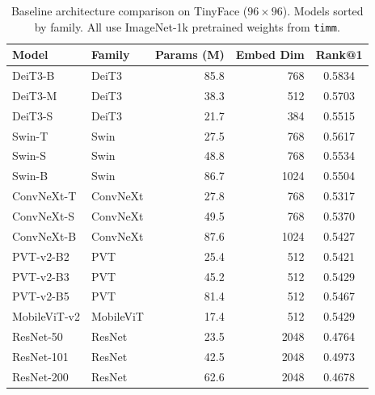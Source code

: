 \begin{table}[t]
\centering
\caption{Baseline architecture comparison on TinyFace ($96\times96$). Models sorted by family.
All use ImageNet-1k pretrained weights from \texttt{timm}.}
\label{tab:architecture-comparison}
\footnotesize
\begin{tabular*}{\linewidth}{@{\extracolsep{\fill}} l l r r c}
\toprule
Model & Family & Params (M) & Embed Dim & Rank@1 \\
\midrule
DeiT3-B & DeiT3 & 85.8 & 768 & 0.5834 \\
DeiT3-M & DeiT3 & 38.3 & 512 & 0.5703 \\
DeiT3-S & DeiT3 & 21.7 & 384 & 0.5515 \\
\midrule
Swin-T & Swin & 27.5 & 768 & 0.5617 \\
Swin-S & Swin & 48.8 & 768 & 0.5534 \\
Swin-B & Swin & 86.7 & 1024 & 0.5504 \\
\midrule
ConvNeXt-T & ConvNeXt & 27.8 & 768 & 0.5317 \\
ConvNeXt-S & ConvNeXt & 49.5 & 768 & 0.5370 \\
ConvNeXt-B & ConvNeXt & 87.6 & 1024 & 0.5427 \\
\midrule
PVT-v2-B2 & PVT & 25.4 & 512 & 0.5421 \\
PVT-v2-B3 & PVT & 45.2 & 512 & 0.5429 \\
PVT-v2-B5 & PVT & 81.4 & 512 & 0.5467 \\
\midrule
MobileViT-v2 & MobileViT & 17.4 & 512 & 0.5429 \\
\midrule
ResNet-50 & ResNet & 23.5 & 2048 & 0.4764 \\
ResNet-101 & ResNet & 42.5 & 2048 & 0.4973 \\
ResNet-200 & ResNet & 62.6 & 2048 & 0.4678 \\
\bottomrule
\end{tabular*}
\end{table}
